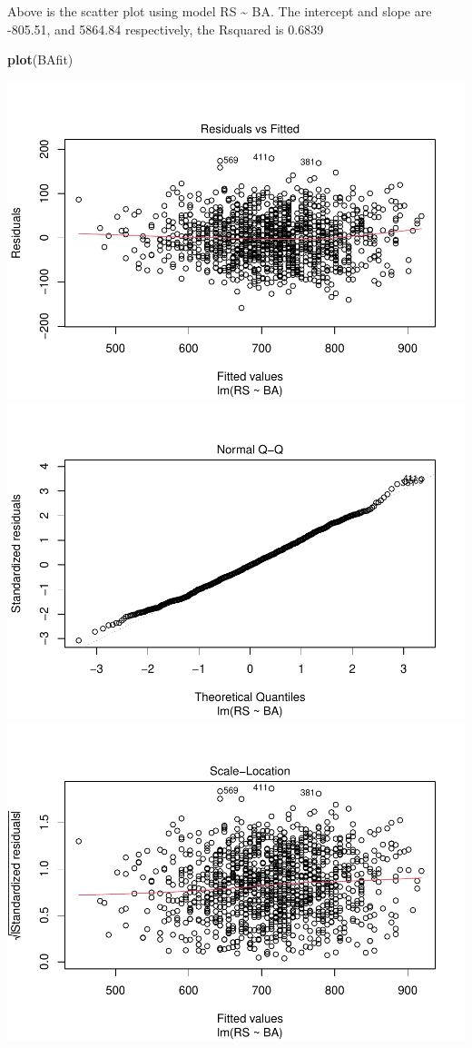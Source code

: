 \documentclass[
]{article}
\newenvironment{Shaded}{\begin{snugshade}}{\end{snugshade}}
\newcommand{\KeywordTok}[1]{\textcolor[rgb]{0.13,0.29,0.53}{\textbf{#1}}}
\newcommand{\NormalTok}[1]{#1}
\begin{document}
Above is the scatter plot using model RS \textasciitilde{} BA. The
intercept and slope are -805.51, and 5864.84 respectively, the Rsquared
is 0.6839

\begin{Shaded}
\begin{Highlighting}[]
\KeywordTok{plot}\NormalTok{(BAfit)}
\end{Highlighting}
\end{Shaded}

\includegraphics{HW2_Liu-Zi-Jian_files/figure-latex/unnamed-chunk-34-1.pdf}
\includegraphics{HW2_Liu-Zi-Jian_files/figure-latex/unnamed-chunk-34-2.pdf}
\includegraphics{HW2_Liu-Zi-Jian_files/figure-latex/unnamed-chunk-34-3.pdf}
\end{document}
